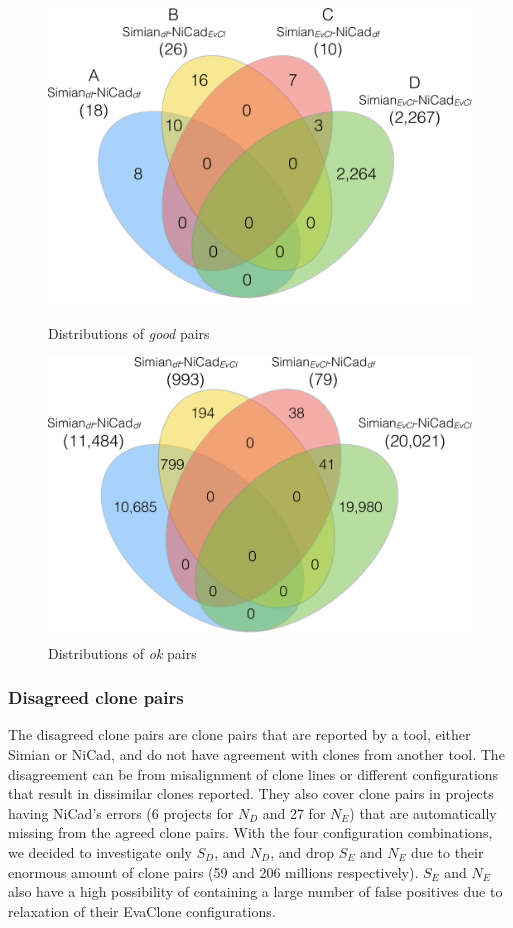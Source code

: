 \documentclass{sig-alternate-05-2015}
\begin{document}
\begin{figure}
	\begin{minipage}{.5\textwidth}
		\centering
		\includegraphics[width=0.7\linewidth]{venn4_pairs_good_pt1+2+3+fixed_nicad-crop}
		\caption{Distributions of \textit{good} pairs}
		\label{fig:venn4_orig_good}
	\end{minipage}
	\begin{minipage}{.5\textwidth}
		\centering
		\includegraphics[width=0.7\linewidth]{venn4_pairs_ok_pt1+2+3+fixed_nicad-crop}
		\caption{Distributions of \textit{ok} pairs}
		\label{fig:venn4_orig_ok}
	\end{minipage}
\end{figure}

\subsubsection{Disagreed clone pairs}

The disagreed clone pairs are clone pairs that are reported by a tool, either Simian or NiCad, and do not have agreement with clones from another tool. The disagreement can be from misalignment of clone lines or different configurations that result in dissimilar clones reported. They also cover clone pairs in projects having NiCad's errors (6 projects for $N_D$ and 27 for $N_E$) that are automatically missing from the agreed clone pairs. With the four configuration combinations, we decided to investigate only $S_D$, and $N_D$, and drop $S_E$ and $N_E$ due to their enormous amount of clone pairs (59 and 206 millions respectively). $S_E$ and $N_E$ also have a high possibility of containing a large number of false positives due to relaxation of their EvaClone configurations. 
\end{document}
